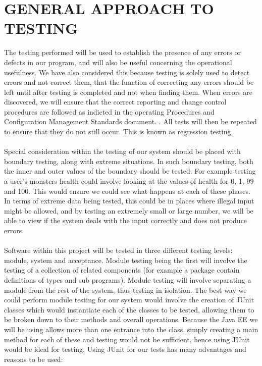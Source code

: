 \documentclass[a4paper]{article}
\begin{document}
\section{GENERAL APPROACH TO TESTING}
The testing performed will be used to establish the presence of any errors or defects in our program, and will also be useful concerning the operational usefulness.  We have also considered this because testing is solely used to detect errors and not correct them, that the function of correcting any errors should be left until after testing is completed and not when finding them. When errors are discovered, we will ensure that the correct reporting and change control procedures are followed as indicted in the operating Procedures and Configuration Management Standards document. \cite{Software Engineering Group Projects. Operating Procedures and Configuration Management Standards.}. All tests will then be repeated to ensure that they do not still occur. This is known as regression testing.
\\\\
Special consideration within the testing of our system should be placed with boundary testing, along with extreme situations. In such boundary testing, both the inner and outer values of the boundary should be tested. For example testing a user's monsters health could involve looking at the values of health for 0, 1, 99 and 100. This would ensure we could see what happens at each of these phases. In terms of extreme data being tested, this could be in places where illegal input might be allowed, and by testing an extremely small or large number, we will be able to view if the system deals with the input correctly and does not produce errors.
\\\\
Software within this project will be tested in three different testing levels: module, system and acceptance. Module testing being the first will involve the testing of a collection of related components (for example a package contain definitions of types and sub programs). Module testing will involve separating a module from the rest of the system, thus testing in isolation. The best way we could perform module testing for our system would involve the creation of JUnit classes which would instantiate each of the classes to be tested, allowing them to be broken down to their methods and overall operations. Because the Java EE we will be using allows more than one entrance into the class, simply creating a main method for each of these and testing would not be sufficient, hence using JUnit would be ideal for testing. Using JUnit for our tests has many advantages and reasons to be used: 
\end{document}
